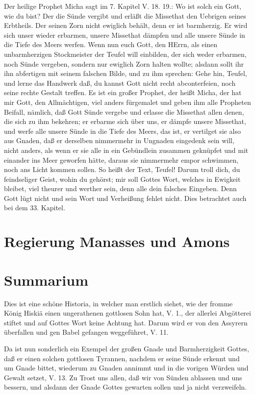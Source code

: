 Der heilige Prophet Micha sagt im 7. Kapitel V. 18. 19.: Wo ist solch ein Gott, wie du bist? Der die Sünde vergibt und erläßt die Missethat den Uebrigen seines Erbtheils. Der seinen Zorn nicht ewiglich behält, denn er ist barmherzig. Er wird sich unser wieder erbarmen, unsere Missethat dämpfen und alle unsere Sünde in die Tiefe des Meers werfen. Wenn nun euch Gott, den HErrn, als einen unbarmherzigen Stockmeister der Teufel will einbilden, der sich weder erbarmen, noch Sünde vergeben, sondern nur ewiglich Zorn halten wollte; alsdann sollt ihr ihn abfertigen mit seinem falschen Bilde, und zu ihm sprechen: Gehe hin, Teufel, und lerne das Handwerk daß, du kannst Gott nicht recht abconterfeien, noch seine rechte Gestalt treffen. Es ist ein großer Prophet, der heißt Micha, der hat mir Gott, den Allmächtigen, viel anders fürgemalet und geben ihm alle Propheten Beifall, nämlich, daß Gott Sünde vergebe und erlasse die Missethat allen denen, die sich zu ihm bekehren; er erbarme sich über uns, er dämpfe unsere Missethat, und werfe alle unsere Sünde in die Tiefe des Meers, das ist, er vertilget sie also aus Gnaden, daß er derselben nimmermehr in Ungnaden eingedenk sein will, nicht anders, als wenn er sie alle in ein Gebündlein zusammen geknüpfet und mit einander ins Meer geworfen hätte, daraus sie nimmermehr empor schwimmen, noch ans Licht
kommen sollen. So heißt der Text, Teufel! Darum troll dich, du feindseliger Geist, wohin du gehörst; mir soll Gottes Wort, welches in Ewigkeit bleibet, viel theurer und werther sein, denn alle dein falsches Eingeben. Denn Gott lügt nicht und sein Wort und Verheißung fehlet nicht. Dies betrachtet auch bei dem 33. Kapitel.

\section[Regierung Manasses und Amons]{Regierung Manasses und Amons}

\section{Summarium}

Dies ist eine schöne Historia, in welcher man erstlich siehet, wie der fromme König Hiskiä einen ungerathenen gottlosen Sohn hat, V. 1., der allerlei Abgötterei stiftet und auf Gottes Wort keine Achtung hat. Darum wird er von den Assyrern überfallen und gen Babel gefangen weggeführet, V. 11.

Da ist nun sonderlich ein Exempel der großen Gnade und Barmherzigkeit Gottes, daß er einen solchen gottlosen Tyrannen, nachdem er seine Sünde erkennt und um Gnade bittet, wiederum zu Gnaden annimmt und in die vorigen Würden und Gewalt setzet, V. 13. Zu Trost uns allen, daß wir von Sünden ablassen und uns bessern, und alsdann der Gnade Gottes gewarten sollen und ja nicht verzweifeln.

